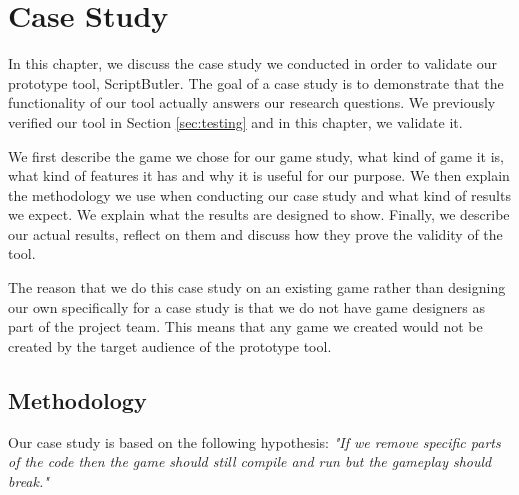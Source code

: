 \chapter{Case Study}
\label{ch:case}
In this chapter, we discuss the case study we conducted in order to validate our prototype tool, ScriptButler. The goal of a case study is to demonstrate that the functionality of our tool actually answers our research questions. We previously verified our tool in Section \ref{sec:testing} and in this chapter, we validate it. 

We first describe the game we chose for our game study, what kind of game it is, what kind of features it has and why it is useful for our purpose. We then explain the methodology we use when conducting our case study and what kind of results we expect. We explain what the results are designed to show. Finally, we describe our actual results, reflect on them and discuss how they prove the validity of the tool.

The reason that we do this case study on an existing game rather than designing our own specifically for a case study is that we do not have game designers as part of the project team. This means that any game we created would not be created by the target audience of the prototype tool. 



\section{Methodology}
Our case study is based on the following hypothesis:\newline
\quad \textit{"If we remove specific parts of the code then the game should still compile and run but the gameplay should \emph{break}."}

